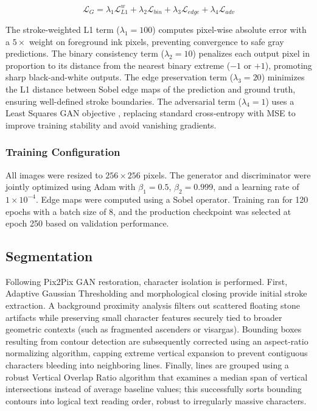 \documentclass[conference]{IEEEtran}
\begin{document}
\begin{equation}
\mathcal{L}_{G} = \lambda_1\mathcal{L}_{L1}^{w} + \lambda_2\mathcal{L}_{bin} + \lambda_3\mathcal{L}_{edge} + \lambda_4\mathcal{L}_{adv}
\end{equation}

The stroke-weighted L1 term ($\lambda_1 = 100$) computes pixel-wise absolute error with a $5\times$ weight on foreground ink pixels, preventing convergence to safe gray predictions. The binary consistency term ($\lambda_2 = 10$) penalizes each output pixel in proportion to its distance from the nearest binary extreme ($-1$ or $+1$), promoting sharp black-and-white outputs. The edge preservation term ($\lambda_3 = 20$) minimizes the L1 distance between Sobel edge maps of the prediction and ground truth, ensuring well-defined stroke boundaries. The adversarial term ($\lambda_4 = 1$) uses a Least Squares GAN objective \cite{mao2017lsgan}, replacing standard cross-entropy with MSE to improve training stability and avoid vanishing gradients.

\subsubsection{Training Configuration}

All images were resized to $256\times256$ pixels. The generator and discriminator were jointly optimized using Adam with $\beta_1 = 0.5$, $\beta_2 = 0.999$, and a learning rate of $1\times10^{-4}$. Edge maps were computed using a Sobel operator. Training ran for 120 epochs with a batch size of 8, and the production checkpoint was selected at epoch 250 based on validation performance.

\subsection{Segmentation}

Following Pix2Pix GAN restoration, character isolation is performed. First, Adaptive Gaussian Thresholding and morphological closing provide initial stroke extraction. A background proximity analysis filters out scattered floating stone artifacts while preserving small character features securely tied to broader geometric contexts (such as fragmented ascenders or visargas). Bounding boxes resulting from contour detection are subsequently corrected using an aspect-ratio normalizing algorithm, capping extreme vertical expansion to prevent contiguous characters bleeding into neighboring lines. Finally, lines are grouped using a robust Vertical Overlap Ratio algorithm that examines a median span of vertical intersections instead of average baseline values; this successfully sorts bounding contours into logical text reading order, robust to irregularly massive characters. 
\end{document}
